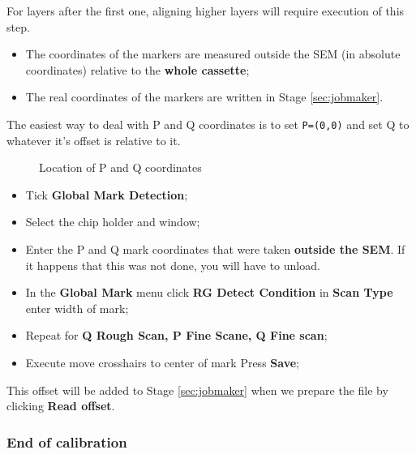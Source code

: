 \begin{framed}\noindent
  For layers after the first one,  aligning higher layers will require execution
  of this step.
  \begin{itemize}
  \item The coordinates of the markers are measured outside the SEM (in absolute
    coordinates) relative to the \textbf{whole cassette};
  \item   The  real   coordinates  of   the   markers  are   written  in   Stage
    \ref{sec:jobmaker}.
  \end{itemize}
\end{framed}

The easiest way to deal with P  and Q coordinates is to set \texttt{P=(0,0)} and
set Q to whatever it's offset is relative to it.

\begin{figure}[h]
  \centering {}
  \caption{\small Location of P and Q coordinates\label{fig:pq_coordinates}}
\end{figure}

\begin{itemize}
\item Tick \textbf{Global Mark Detection};
\item Select the chip holder and window;
\item Enter  the P and  Q mark coordinates  that were taken  \textbf{outside the
    SEM}. If it happens that this was not done, you will have to unload.
\item In the  \textbf{Global Mark} menu click \textbf{RG  Detect Condition} \ira
  in \textbf{Scan Type} enter width of mark;
\item Repeat for \textbf{Q Rough Scan, P Fine Scane, Q Fine scan};
\item Execute \ira move crosshairs to center of mark \ira Press \textbf{Save};
\end{itemize}

\begin{framed}\noindent

  This offset will be added to Stage \ref{sec:jobmaker} when we prepare the file
  by clicking \textbf{Read offset}.
\end{framed}

\subsubsection{End of calibration}
\label{sec:end-calibration}

